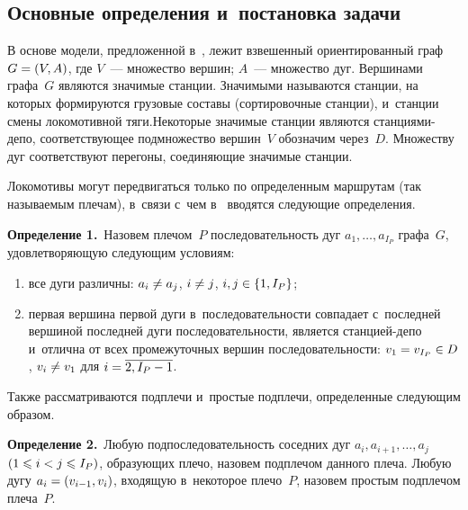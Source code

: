 \begin{multicols}{2}
\vspace*{-12pt}

\section{Основные определения и~постановка задачи}

\vspace*{-6pt}

В основе модели, предложенной в~\cite{AzanovBuyanov},
лежит взвешенный ориентированный граф $G \hm= (V, A)$, где $V$~--- 
множество вершин; $A$~--- множество дуг.
Вершинами графа~$G$ являются значимые станции. Значимыми называются 
станции, на которых формируются грузовые составы (сортировочные станции), 
и~станции смены локомотивной тяги.\linebreak Некото\-рые значимые станции являются 
стан\-ци\-ями-де\-по, соответствующее подмножество вершин~$V$ обозначим через~$D$. 
Множеству дуг соответствуют перегоны, соединяющие значимые станции.

Локомотивы могут передвигаться только по определенным маршрутам 
(так называемым плечам), в~связи с~чем в~\cite{AzanovBuyanov} вводятся 
следующие определения.

\smallskip

\noindent
\textbf{Определение 1.}\
    Назовем плечом~$P$ последовательность дуг $a_1,\ldots, a_{I_P}$ графа~$G$, 
     удовлетворяющую следующим условиям:
    \begin{enumerate}[(1)]

    \item
        все дуги различны: $a_i \hm\ne a_j$, $i \hm\ne j$, $i,j \hm\in \{1, I_P\}$;

    \item
        первая вершина первой дуги в~последовательности совпадает 
        с~последней вершиной последней дуги последовательности, является 
        стан\-ци\-ей-де\-по и~отлична от всех промежуточных вершин последовательности: 
        $v_1\hm = v_{I_P}\hm\in D$, $ v_i \hm\ne v_1$ для $i\hm=\overline{2, I_P-1}$.
    
    \end{enumerate}

Также рассматриваются подплечи и~простые подплечи, определенные следующим образом.
    
\smallskip

\noindent
\textbf{Определение 2.}\
  Любую подпоследовательность соседних дуг $a_i, a_{i+1},\ldots, a_j$ 
   $(1\hm\leqslant i\hm<j \hm\leqslant I_P)$, образующих плечо, назовем 
   подплечом данного плеча. Любую дугу $a_i\hm=(v_{i-1},v_i)$, 
   входящую в~некоторое плечо~$P$, назовем простым подплечом плеча~$P$.
    

\end{multicols}
